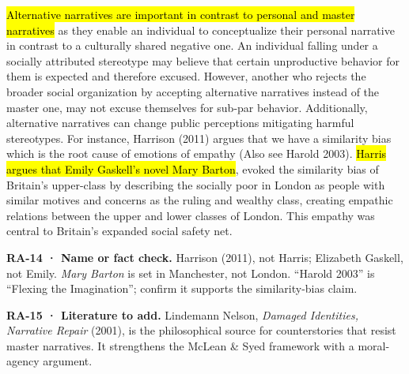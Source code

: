 \documentclass[
  letterpaper,
  DIV=11,
  numbers=noendperiod]{scrartcl}
\theoremstyle{remark}
\begin{document}
\hl{Alternative narratives are important in contrast to personal and
master narratives} as they enable an individual to conceptualize their
personal narrative in contrast to a culturally shared negative one. An
individual falling under a socially attributed stereotype may believe
that certain unproductive behavior for them is expected and therefore
excused. However, another who rejects the broader social organization by
accepting alternative narratives instead of the master one, may not
excuse themselves for sub-par behavior. Additionally, alternative
narratives can change public perceptions mitigating harmful stereotypes.
For instance, Harrison (2011) argues that we have a similarity bias
which is the root cause of emotions of empathy (Also see Harold 2003).
\hl{Harris argues that Emily Gaskell's novel Mary Barton}, evoked the
similarity bias of Britain's upper-class by describing the socially poor
in London as people with similar motives and concerns as the ruling and
wealthy class, creating empathic relations between the upper and lower
classes of London. This empathy was central to Britain's expanded social
safety net.

\begin{tcolorbox}[enhanced jigsaw, arc=.35mm, bottomrule=.15mm, bottomtitle=1mm, breakable, colback=white, colbacktitle=quarto-callout-caution-color!10!white, colframe=quarto-callout-caution-color-frame, coltitle=black, left=2mm, leftrule=.75mm, opacityback=0, opacitybacktitle=0.6, rightrule=.15mm, title=\textcolor{quarto-callout-caution-color}{\faFire}\hspace{0.5em}{Caution}, titlerule=0mm, toprule=.15mm, toptitle=1mm]

\textbf{RA-14 · Name or fact check.} Harrison (2011), not Harris;
Elizabeth Gaskell, not Emily. \emph{Mary Barton} is set in Manchester,
not London. ``Harold 2003'' is ``Flexing the Imagination''; confirm it
supports the similarity-bias claim.

\end{tcolorbox}

\begin{tcolorbox}[enhanced jigsaw, arc=.35mm, bottomrule=.15mm, bottomtitle=1mm, breakable, colback=white, colbacktitle=quarto-callout-tip-color!10!white, colframe=quarto-callout-tip-color-frame, coltitle=black, left=2mm, leftrule=.75mm, opacityback=0, opacitybacktitle=0.6, rightrule=.15mm, title=\textcolor{quarto-callout-tip-color}{\faLightbulb}\hspace{0.5em}{Tip}, titlerule=0mm, toprule=.15mm, toptitle=1mm]

\textbf{RA-15 · Literature to add.} Lindemann Nelson, \emph{Damaged
Identities, Narrative Repair} (2001), is the philosophical source for
counterstories that resist master narratives. It strengthens the McLean
\& Syed framework with a moral-agency argument.

\end{tcolorbox}
\end{document}

